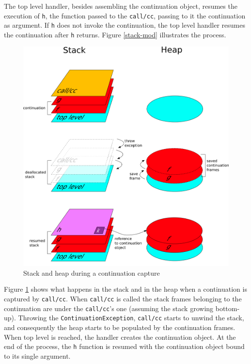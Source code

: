 \documentclass[12pt,a4paper,oneside,openright]{book}
\begin{document}
The top level handler, besides assembling the continuation object,
resumes the execution of \texttt{h}, the function passed to the
\texttt{call/cc}, passing to it the continuation as argument. If
\texttt{h} does not invoke the continuation, the top level handler
resumes the continuation after \texttt{h} returns. Figure
\ref{stack-mod} illustrates the process.

\begin{figure}[htbp]
\centering
\includegraphics{figures/frames.png}
\caption{Stack and heap during a continuation capture \label{frames}}
\end{figure}

Figure \ref{frames} shows what happens in the stack and in the heap when
a continuation is captured by \texttt{call/cc}. When \texttt{call/cc} is
called the stack frames belonging to the continuation are under the
\texttt{call/cc}'s one (assuming the stack growing bottom-up). Throwing
the \texttt{ContinuationException}, \texttt{call/cc} starts to unwind
the stack, and consequently the heap starts to be populated by the
continuation frames. When top level is reached, the handler creates the
continuation object. At the end of the process, the \texttt{h} function
is resumed with the continuation object bound to its single argument.
\end{document}
